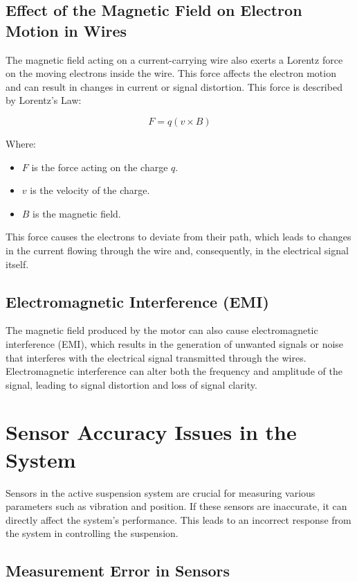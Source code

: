 \subsection{Effect of the Magnetic Field on Electron Motion in Wires}

The magnetic field acting on a current-carrying wire also exerts a Lorentz force on the moving electrons inside the wire. This force affects the electron motion and can result in changes in current or signal distortion. This force is described by Lorentz's Law:

\[
F = q(v \times B)
\]

Where:
\begin{itemize}
	\item \( F \) is the force acting on the charge \( q \).
	\item \( v \) is the velocity of the charge.
	\item \( B \) is the magnetic field.
\end{itemize}

This force causes the electrons to deviate from their path, which leads to changes in the current flowing through the wire and, consequently, in the electrical signal itself.

\subsection{Electromagnetic Interference (EMI)}

The magnetic field produced by the motor can also cause electromagnetic interference (EMI), which results in the generation of unwanted signals or noise that interferes with the electrical signal transmitted through the wires. Electromagnetic interference can alter both the frequency and amplitude of the signal, leading to signal distortion and loss of signal clarity.

\section{Sensor Accuracy Issues in the System}

Sensors in the active suspension system are crucial for measuring various parameters such as vibration and position. If these sensors are inaccurate, it can directly affect the system's performance. This leads to an incorrect response from the system in controlling the suspension.

\subsection{Measurement Error in Sensors}

